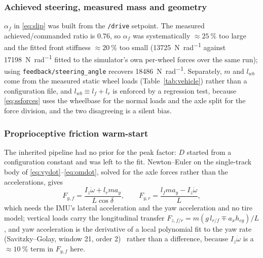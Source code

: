 \subsubsection{Achieved steering, measured mass and geometry}
$\alpha_{f}$ in \eqref{eq:slip} was built from the \texttt{/drive} setpoint. The
measured achieved/commanded ratio is \num{0.76}, so $\alpha_{f}$ was
systematically $\approx\SI{25}{\percent}$ too large and the fitted front
stiffness $\approx\SI{20}{\percent}$ too small
(\SI{13725}{\newton\per\radian} against \SI{17198}{\newton\per\radian} fitted to
the simulator's own per-wheel forces over the same run); using
\texttt{feedback/\allowbreak steering\_angle} recovers
\SI{18486}{\newton\per\radian}. Separately, $m$ and $l_{wb}$ come from the
measured static wheel loads (Table~\ref{tab:vehicle}) rather than a
configuration file, and $l_{wb}\equiv l_{f}+l_{r}$ is enforced by a regression
test, because \eqref{eq:ssforces} uses the wheelbase for the normal loads and
the axle split for the force division, and the two disagreeing is a silent bias.

\subsubsection{Proprioceptive friction warm-start}
\label{subsec:friction}
The inherited pipeline had no prior for the peak factor: $D$ started from a
configuration constant and was left to the fit. Newton--Euler on the
single-track body of \eqref{eq:vydot}--\eqref{eq:omdot}, solved for the axle
forces rather than the accelerations, gives
\begin{equation}
F_{y,f}=\frac{I_{z}\dot\omega+l_{r}m a_{y}}{L\cos\delta},\qquad
F_{y,r}=\frac{l_{f}m a_{y}-I_{z}\dot\omega}{L},
\label{eq:newtoneuler}
\end{equation}
which needs the IMU's lateral acceleration and the yaw acceleration and no tire
model; vertical loads carry the longitudinal transfer
$F_{z,f/r}=m(g\,l_{r/f}\mp a_{x}h_{cg})/L$ \cite{rajamani2012}, and yaw
acceleration is the derivative of a local polynomial fit to the yaw rate
(Savitzky--Golay, window 21, order 2)~\cite{savitzky1964} rather than a
difference, because $I_{z}\dot\omega$ is a $\approx\SI{10}{\percent}$ term in
$F_{y,f}$ here.

